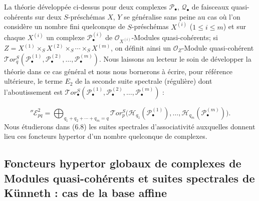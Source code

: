 \begin{env}[6.5.15]
La théorie développée ci-dessus pour deux complexes $\mathscr P_\bullet$,
$\mathscr Q_\bullet$ de faisceaux quasi-cohérents sur deux $S$-préschémas
$X$, $Y$ se généralise sans peine au cas où l'on considère un nombre fini
quelconque de $S$-préschémas $X^{(i)}$ ($1\leqslant i\leqslant m$) et sur
chaque $X^{(i)}$ un complexe $\mathscr P_\bullet^{(i)}$ de
$\mathscr O_{X^{(i)}}$-Modules quasi-cohérents; si
$Z=X^{(1)}\times_S X^{(2)}\times_S\cdots\times_S X^{(m)}$, on définit ainsi un
$\mathscr O_Z$-Module quasi-cohérent
$\mathscr{T}\!or_q^S(\mathscr P_\bullet^{(1)},\mathscr P_\bullet^{(2)},
\ldots,\mathscr P_\bullet^{(m)})$. Nous laissons au lecteur le soin de
développer la théorie dans ce cas général et nous nous bornerons à écrire,
pour référence ultérieure, le terme $E_2$ de la seconde suite spectrale
(régulière) dont l'aboutissement est
$\mathscr{T}\!or_\bullet^S(\mathscr P_\bullet^{(1)},
\mathscr P_\bullet^{(2)},\ldots,\mathscr P_\bullet^{(m)})$ :


\[
  ''\mathscr E_{pq}^2
  =\bigoplus_{q_1+q_2+\cdots+q_m=q}
   \mathscr{T}\!or_p^S
   \bigl(\mathscr H_{q_1}(\mathscr P_\bullet^{(1)}),\ldots,
         \mathscr H_{q_m}(\mathscr P_\bullet^{(m)})\bigr).
  \tag{6.5.15.1}\label{III.6.5.15.1.fr}
\]
Nous étudierons dans (6.8) les suites spectrales d'associativité auxquelles
donnent lieu ces foncteurs hypertor d'un nombre quelconque de complexes.
\end{env}

\subsection{Foncteurs hypertor globaux de complexes de Modules quasi-cohérents
et suites spectrales de Künneth : cas de la base affine}
\label{subsection:III.6.6.fr}

